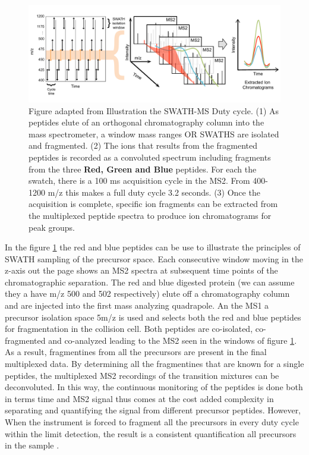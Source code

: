 \documentclass[a4paper]{book}
\begin{document}
	\begin{figure}[!htb]
		\centering
		\includegraphics[width=1.0\linewidth]{3.Proteomics/XIC.pdf}
		\caption{ Figure adapted from \citep{Rost2017AutomatedChromatograms} Illustration the SWATH-MS Duty cycle. (1) As peptides elute of an orthogonal chromatography column into the mass spectrometer, a window mass ranges OR SWATHS are isolated and fragmented. (2) The ions that results from the fragmented peptides is recorded as a convoluted spectrum including fragments from the three \textbf{Red, Green and Blue} peptides. For each the swatch, there is a 100 ms acquisition cycle in the MS2. From 400-1200 m/z this makes a full duty cycle 3.2 seconds. (3) Once the acquisition is complete, specific ion fragments can be extracted from the multiplexed peptide spectra to produce ion chromatograms for peak groups. }
		\label{fig:Principles SWATH MS}
	\end{figure}
	
	In the figure \ref{fig:Principles SWATH MS} the red and blue peptides can be use to illustrate the principles of  SWATH sampling of the precursor space. Each consecutive window moving in the z-axis out the page shows an MS2 spectra at subsequent time points of the chromatographic separation. The red and blue digested protein (we can assume they a have m/z 500 and 502 respectively) elute off a chromatography column and are injected into the first mass analyzing quadrapole. An the MS1 a precursor isolation space 5m/z is used and selects both the red and blue peptides for fragmentation in the collision cell. Both peptides are co-isolated, co-fragmented and co-analyzed leading to the MS2 seen in the windows of figure \ref{fig:Principles SWATH MS}. As a result, fragmentines from all the precursors are present in the final multiplexed data. By determining all the fragmentines that are known for a single peptides, the multiplexed MS2 recordings of the transition mixtures can be deconvoluted. 	In this way, the continuous monitoring of the peptides is done both in terms time and MS2 signal thus comes at the cost added complexity in separating and quantifying the signal from different precursor peptides. However, When the instrument is forced to fragment all the precursors in every duty cycle within the limit detection, the result is a consistent quantification all precursors in the sample \citep{Gillet2012TargetedAnalysis}. 
	
\end{document}
